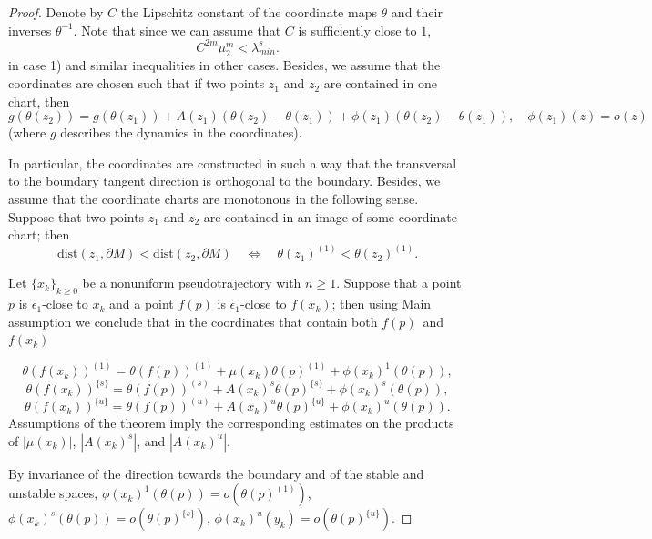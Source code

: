 \documentclass[11pt]{article}
\theoremstyle{Mystyle}
\begin{document}
\begin{proof}
Denote by $C$ the Lipschitz constant of the coordinate maps $\theta$ and their inverses $\theta^{-1}$. %
Note that since  we can assume that $C$ is sufficiently close to $1$,
\begin{equation}
\label{Crestr}
C^{2m}\mu_2^m<\lambda_{min}^s.
\end{equation}
in case 1) and similar inequalities in other cases.
 Besides, we assume that the coordinates are chosen such that if two points $z_1$ and $z_2$ are contained in one chart, then
$$g(\theta(z_2)) = g(\theta(z_1)) + A(z_1)(\theta(z_2) - \theta(z_1)) + \phi(z_1)(\theta(z_2)-\theta(z_1)),\quad \phi(z_1)(z) = o(z)$$
(where $g$ describes the dynamics in the coordinates).

In particular, the coordinates are constructed in such a way that the transversal to the boundary tangent direction is orthogonal to the boundary.
Besides, we assume that the coordinate charts are monotonous in the following sense. Suppose that two points $z_1$ and $z_2$ are contained in an image of some coordinate chart; then
$$\mbox{dist}(z_1,\partial M) < \mbox{dist}(z_2,\partial M) \quad\Longleftrightarrow\quad
\theta(z_1)^{(1)} < \theta(z_2)^{(1)}.$$

Let $\{x_k\}_{k\geq0}$ be a nonuniform pseudotrajectory with $n\geq 1$. 
Suppose that a point $p$ is $\epsilon_1$-close to $x_k$ and a point $f(p)$ is $\epsilon_1$-close to $f(x_k)$; then
using Main assumption we conclude that in the coordinates that contain both $f(p)$~and~$f(x_k)$

$$\theta(f(x_k))^{(1)} = \theta(f(p))^{(1)} + \mu(x_k) \theta(p)^{(1)} + \phi(x_k)^{1}(\theta(p)),$$
\begin{equation}
\label{coordrelSt}
\theta(f(x_k))^{\{s\}} = \theta(f(p))^{(s)} + A(x_k)^{s}\theta(p)^{\{s\}} + \phi(x_k)^{s}(\theta(p)),
\end{equation}
\begin{equation}
\label{coordrelUnst}
\theta(f(x_k))^{\{u\}} = \theta(f(p))^{(u)} + A(x_k)^{u}\theta(p)^{\{u\}} + \phi(x_k)^{u}(\theta(p)).
\end{equation}
Assumptions of the theorem imply the corresponding estimates on the products of $|\mu(x_k)|$, $|A(x_k)^s|$, and $|A(x_k)^u|$.

By invariance of the direction towards the boundary and of the stable and unstable spaces,
 $\phi(x_k)^1(\theta(p)) = o(\theta(p)^{(1)})$, $\phi(x_k)^{s}(\theta(p)) = o(\theta(p)^{\{s\}})$, $\phi(x_k)^{u}(y_k) = o(\theta(p)^{\{u\}})$.


\end{proof}
\end{document}
